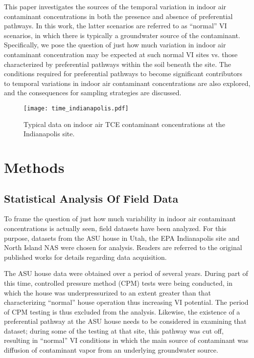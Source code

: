 \documentclass[journal=esthag,manuscript=article]{achemso}
\begin{document}
This paper investigates the sources of the temporal variation in indoor air contaminant concentrations in both the presence and absence of preferential pathways.
In this work, the latter scenarios are referred to as “normal” VI scenarios, in which there is typically a groundwater source of the contaminant.
Specifically, we pose the question of just how much variation in indoor air contaminant concentration may be expected at such normal VI sites vs. those characterized by preferential pathways within the soil beneath the site.
The conditions required for preferential pathways to become significant contributors to temporal variations in indoor air contaminant concentrations are also explored, and the consequences for sampling strategies are discussed.\par

\begin{figure}
 \caption{Typical data on indoor air TCE contaminant concentrations at the Indianapolis site\cite{u.s._environmental_protection_agency_assessment_2015}.}\label{fig:indianapolis}
 \texttt{[image: time\_indianapolis.pdf]}
\end{figure}

\section{Methods}

\subsection{Statistical Analysis Of Field Data}

To frame the question of just how much variability in indoor air contaminant concentrations is actually seen, field datasets have been analyzed.
For this purpose, datasets from the ASU house in Utah, the EPA Indianapolis site and North Island NAS were chosen for analysis.
Readers are referred to the original published works for details regarding data acquisition\cite{holton_evaluation_2015,guo_vapor_2015,holton_temporal_2013,hosangadi_high-frequency_2017,u.s._environmental_protection_agency_assessment_2015}.\par

The ASU house data were obtained over a period of several years.
During part of this time, controlled pressure method (CPM) tests were being conducted, in which the house was underpressurized to an extent greater than that characterizing “normal” house operation thus increasing VI potential\cite{mchugh_evaluation_2012,mchugh_recent_2017,holton_evaluation_2015}.
The period of CPM testing is thus excluded from the analysis.
Likewise, the existence of a preferential pathway at the ASU house needs to be considered in examining that dataset; during some of the testing at that site, this pathway was cut off, resulting in “normal” VI conditions in which the main source of contaminant was diffusion of contaminant vapor from an underlying groundwater source.\par
\end{document}
